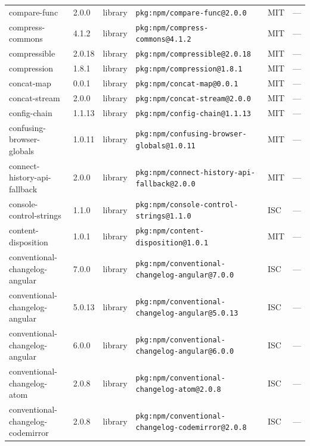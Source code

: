 \documentclass[11pt,a4paper]{article}
\begin{document}
\begin{longtable}{|p{4cm}|p{2cm}|p{1.6cm}|p{5cm}|p{1.5cm}|p{3.5cm}|}
\raggedright compare-func & 2.0.0 & library & \small\texttt{pkg:npm/compare-func@2.0.0} & MIT & \small — \\
\raggedright compress-commons & 4.1.2 & library & \small\texttt{pkg:npm/compress-commons@4.1.2} & MIT & \small — \\
\raggedright compressible & 2.0.18 & library & \small\texttt{pkg:npm/compressible@2.0.18} & MIT & \small — \\
\raggedright compression & 1.8.1 & library & \small\texttt{pkg:npm/compression@1.8.1} & MIT & \small — \\
\raggedright concat-map & 0.0.1 & library & \small\texttt{pkg:npm/concat-map@0.0.1} & MIT & \small — \\
\raggedright concat-stream & 2.0.0 & library & \small\texttt{pkg:npm/concat-stream@2.0.0} & MIT & \small — \\
\raggedright config-chain & 1.1.13 & library & \small\texttt{pkg:npm/config-chain@1.1.13} & MIT & \small — \\
\raggedright confusing-browser-globals & 1.0.11 & library & \small\texttt{pkg:npm/confusing-browser-globals@1.0.11} & MIT & \small — \\
\raggedright connect-history-api-fallback & 2.0.0 & library & \small\texttt{pkg:npm/connect-history-api-fallback@2.0.0} & MIT & \small — \\
\raggedright console-control-strings & 1.1.0 & library & \small\texttt{pkg:npm/console-control-strings@1.1.0} & ISC & \small — \\
\raggedright content-disposition & 1.0.1 & library & \small\texttt{pkg:npm/content-disposition@1.0.1} & MIT & \small — \\
\raggedright conventional-changelog-angular & 7.0.0 & library & \small\texttt{pkg:npm/conventional-changelog-angular@7.0.0} & ISC & \small — \\
\raggedright conventional-changelog-angular & 5.0.13 & library & \small\texttt{pkg:npm/conventional-changelog-angular@5.0.13} & ISC & \small — \\
\raggedright conventional-changelog-angular & 6.0.0 & library & \small\texttt{pkg:npm/conventional-changelog-angular@6.0.0} & ISC & \small — \\
\raggedright conventional-changelog-atom & 2.0.8 & library & \small\texttt{pkg:npm/conventional-changelog-atom@2.0.8} & ISC & \small — \\
\raggedright conventional-changelog-codemirror & 2.0.8 & library & \small\texttt{pkg:npm/conventional-changelog-codemirror@2.0.8} & ISC & \small — \\

\end{longtable}
\end{document}
